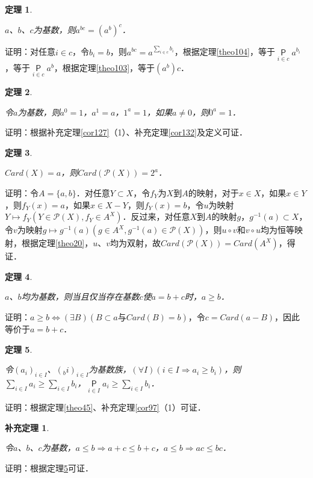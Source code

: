 \documentclass[12pt, a4paper, oneside]{book}
\newtheorem{theo}{定理}
\newtheorem{cor}{补充定理}
\begin{document}
			\begin{theo}\label{theo106}
				\hfill\par
				$a$、$b$、$c$为基数，则$a^{bc}=(a^b)^c$．
			\end{theo}
			证明：对任意$i\in c$，令$b_i=b$，则$a^{bc}=a^{\sum\limits_{i\in c} b_i}$，根据定理\ref{theo104}，等于$\mathop{\mathsf{P}}\limits_{i\in c}a^{b_i}$，等于$\mathop{\mathsf{P}}\limits_{i\in c}a^b$，根据定理\ref{theo103}，等于$(a^b)c$．
						
			\begin{theo}\label{theo107}
				\hfill\par
				令$a$为基数，则$a^0=1$，$a^1=a$，$1^a=1$，如果$a\neq 0$，则$0^a=1$．
			\end{theo}
			证明：根据补充定理\ref{cor127}（1）、补充定理\ref{cor132}及定义可证．
			
			\begin{theo}\label{theo108}
				\hfill\par
				$Card(X)=a$，则$Card(\mathcal{P}(X))=2^a$．
			\end{theo}
			证明：令$A=\{a, b\}$．对任意$Y\subset X$，令$f_Y$为$X$到$A$的映射，对于$x\in X$，如果$x\in Y$，则$f_Y(x)=a$，如果$x\in X-Y$，则$f_Y(x)=b$，令$u$为映射$Y\mapsto f_Y(Y\in \mathcal{P}(X), f_Y\in A^X)$．反过来，对任意$X$到$A$的映射$g$，$g^{-1}(a)\subset X$，令$v$为映射$g\mapsto g^{-1}(a)(g\in A^X, g^{-1}(a)\in \mathcal{P}(X))$，则$u\circ v$和$v\circ u$均为恒等映射，根据定理\ref{theo20}，$u$、$v$均为双射，故$Card(\mathcal{P}(X))= Card(A^X)$，得证．
						
			\begin{theo}\label{theo109}
				\hfill\par
				$a$、$b$均为基数，则当且仅当存在基数$c$使$a=b+c$时，$a\geq b$．
			\end{theo}
			证明：$a\geq b\Leftrightarrow (\exists B)(B\subset a\text{与}Card(B)=b)$，令$c=Card(a-B)$，因此等价于$a=b+c$．
						
			\begin{theo}\label{theo110}
				\hfill\par
				令$(a_i)_{i\in I}$、$(_bi)_{i\in I}$为基数族，$(\forall I)(i\in I\Rightarrow a_i\geq b_i)$，则$\sum\limits_{i\in I}a_i\geq \sum\limits_{i\in I}b_i$，$\mathop{\mathsf{P}}\limits_{i\in I}a_i\geq \sum\limits_{i\in I}b_i$．
			\end{theo}
			证明：根据定理\ref{theo45}、补充定理\ref{cor97}（1）可证．
			
			\begin{cor}\label{cor298}
				\hfill\par
				令$a$、$b$、$c$为基数，$a\leq b\Rightarrow a+c\leq b+c$，$a\leq b\Rightarrow ac\leq bc$．
			\end{cor}
			证明：根据定理\ref{theo110}可证．
						
\end{document}
